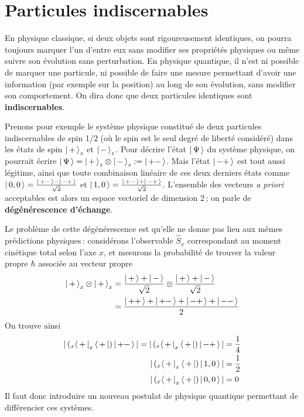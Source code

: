 \section{Particules indiscernables}

    En physique classique, si deux objets sont rigoureusement identiques, on pourra toujours marquer l’un d’entre eux sans modifier ses propriétés physiques ou même suivre son évolution sans perturbation. En physique quantique, il n’est ni possible de marquer une particule, ni possible de faire une mesure permettant d’avoir une information (par exemple sur la position) au long de son évolution, sans modifier son comportement. On dira donc que deux particules identiques sont \textbf{indiscernables}.

    Prenons pour exemple le système physique constitué de deux particules indiscernables de spin 1/2 (où le spin est le seul degré de liberté considéré) dans les états de spin $\left| \, + \, \right>_z$ et $\left| \, - \, \right>_z$. Pour décrire l’état $\left| \, \Psi \, \right>$ du système physique, on pourrait écrire $\left| \, \Psi \, \right> = \left| \, + \, \right>_z \otimes \left| \, - \, \right>_z := \left| \, +- \, \right>$. Mais l’état $\left| \, -+ \, \right>$ est tout aussi légitime, ainsi que toute combinaison linéaire de ces deux derniers états comme $\left| \, 0,0 \, \right> = \frac{\left| \, +- \, \right> - \left| \, -+ \, \right>}{\sqrt{2}}$ et $\left| \, 1,0 \, \right> = \frac{\left| \, +- \, \right> + \left| \, -+ \, \right>}{\sqrt{2}}$. L’ensemble des vecteurs \textit{a priori} acceptables est alors un espace vectoriel de dimension 2 ; on parle de \textbf{dégénérescence d’échange}.

    Le problème de cette dégénérescence est qu’elle ne donne pas lieu aux mêmes prédictions physiques : considérons l’observable $\hat{S}_x$ correspondant au moment cinétique total selon l’axe $x$, et mesurons la probabilité de trouver la valeur propre $\hbar$ associée au vecteur propre
    \begin{align*}
        \left| \, + \, \right>_x \otimes \left| \, + \, \right>_x
        &= \frac{\left| \, + \, \right> + \left| \, - \, \right>}{\sqrt{2}} \otimes \frac{\left| \, + \, \right> + \left| \, - \, \right>}{\sqrt{2}} \\
        &= \frac{\left| \, ++ \, \right> + \left| \, +- \, \right> + \left| \, -+ \, \right> + \left| \, -- \, \right>}{2}
    \end{align*}
    On trouve ainsi 
    \begin{align*}
        \left\lvert \, (_x\left< \, + \, \right|_x\left< \, + \, \right|) \left| \, +- \, \right> \, \right\rvert =  \left\lvert \, (_x\left< \, + \, \right|_x\left< \, + \, \right|) \left| \, -+ \, \right> \, \right\rvert &= \frac{1}{4} \\
        \left\lvert \, (_x\left< \, + \, \right|_x\left< \, + \, \right|) \left| \, 1,0 \, \right> \, \right\rvert &= \frac{1}{2} \\
        \left\lvert \, (_x\left< \, + \, \right|_x\left< \, + \, \right|) \left| \, 0,0 \, \right> \, \right\rvert &= 0
    \end{align*}
    Il faut donc introduire un nouveau postulat de physique quantique permettant de différencier ces systèmes.

